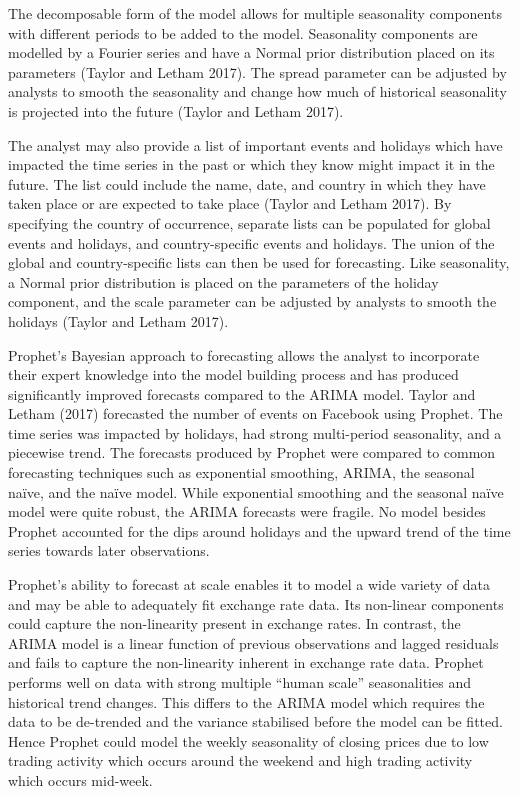 \documentclass[12pt,a4paper]{article}
\numberwithin{equation}{section}
\numberwithin{figure}{section}
\numberwithin{table}{section}
\begin{document}
The decomposable form of the model allows for multiple seasonality
components with different periods to be added to the model. Seasonality
components are modelled by a Fourier series and have a Normal prior
distribution placed on its parameters (Taylor and Letham 2017). The
spread parameter can be adjusted by analysts to smooth the seasonality
and change how much of historical seasonality is projected into the
future (Taylor and Letham 2017).

The analyst may also provide a list of important events and holidays
which have impacted the time series in the past or which they know might
impact it in the future. The list could include the name, date, and
country in which they have taken place or are expected to take place
(Taylor and Letham 2017). By specifying the country of occurrence,
separate lists can be populated for global events and holidays, and
country-specific events and holidays. The union of the global and
country-specific lists can then be used for forecasting. Like
seasonality, a Normal prior distribution is placed on the parameters of
the holiday component, and the scale parameter can be adjusted by
analysts to smooth the holidays (Taylor and Letham 2017).

Prophet's Bayesian approach to forecasting allows the analyst to
incorporate their expert knowledge into the model building process and
has produced significantly improved forecasts compared to the ARIMA
model. Taylor and Letham (2017) forecasted the number of events on
Facebook using Prophet. The time series was impacted by holidays, had
strong multi-period seasonality, and a piecewise trend. The forecasts
produced by Prophet were compared to common forecasting techniques such
as exponential smoothing, ARIMA, the seasonal naïve, and the naïve
model. While exponential smoothing and the seasonal naïve model were
quite robust, the ARIMA forecasts were fragile. No model besides Prophet
accounted for the dips around holidays and the upward trend of the time
series towards later observations.

Prophet's ability to forecast at scale enables it to model a wide
variety of data and may be able to adequately fit exchange rate data.
Its non-linear components could capture the non-linearity present in
exchange rates. In contrast, the ARIMA model is a linear function of
previous observations and lagged residuals and fails to capture the
non-linearity inherent in exchange rate data. Prophet performs well on
data with strong multiple ``human scale'' seasonalities and historical
trend changes. This differs to the ARIMA model which requires the data
to be de-trended and the variance stabilised before the model can be
fitted. Hence Prophet could model the weekly seasonality of closing
prices due to low trading activity which occurs around the weekend and
high trading activity which occurs mid-week.
\end{document}
